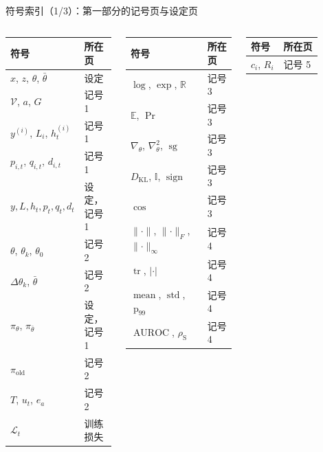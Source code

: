 \documentclass[aspectratio=169,11pt]{beamer}
\newcommand{\E}{\mathbb{E}}
\newcommand{\pit}{\pi_\theta}
\newcommand{\pitea}{\pi_{\bar\theta}}
\newcommand{\piold}{\pi_{\mathrm{old}}}
\newcommand{\sg}{\operatorname{sg}}
\newcommand{\KL}{D_{\mathrm{KL}}}
\newcommand{\Ind}{\mathbb{I}}
\newcommand{\abs}[1]{\lvert #1\rvert}
\newcommand{\norm}[1]{\lVert #1\rVert}
\newcommand{\pct}{\operatorname{p}_{99}}
\newcommand{\AUROC}{\operatorname{AUROC}}
\begin{document}
\begin{frame}{符号索引（1/3）：第一部分的记号页与设定页}
\scriptsize
\setlength{\tabcolsep}{3pt}\renewcommand{\arraystretch}{1.15}
\begin{columns}[T]
\begin{tabular}{@{}ll@{}}
\toprule
\textbf{符号} & \textbf{所在页}\\ \midrule
$x$, $z$, $\theta$, $\bar\theta$ & 设定\\
$\mathcal V$, $a$, $G$ & 记号 1\\
$y^{(i)}$, $L_i$, $h^{(i)}_t$ & 记号 1\\
$p_{i,t}$, $q_{i,t}$, $d_{i,t}$ & 记号 1\\
$y,L,h_t,p_t,q_t,d_t$ & 设定，记号 1\\
$\theta$, $\theta_k$, $\theta_0$ & 记号 2\\
$\Delta\theta_k$, $\bar\theta$ & 记号 2\\
$\pit$, $\pitea$ & 设定，记号 1\\
$\piold$ & 记号 2\\
$T$, $u_t$, $e_a$ & 记号 2\\
$\mathcal L_t$ & 训练损失\\
\bottomrule
\end{tabular}
\begin{tabular}{@{}ll@{}}
\toprule
\textbf{符号} & \textbf{所在页}\\ \midrule
$\log$, $\exp$, $\mathbb R$ & 记号 3\\
$\E$, $\Pr$ & 记号 3\\
$\nabla_\theta$, $\nabla^2_\theta$, $\sg$ & 记号 3\\
$\KL$, $\Ind$, $\operatorname{sign}$ & 记号 3\\
$\cos$ & 记号 3\\
$\norm{\cdot}$, $\norm{\cdot}_F$, $\norm{\cdot}_\infty$ & 记号 4\\
$\operatorname{tr}$, $\abs{\cdot}$ & 记号 4\\
$\operatorname{mean}$, $\operatorname{std}$, $\pct$ & 记号 4\\
$\AUROC$, $\rho_{\mathrm S}$ & 记号 4\\
\bottomrule
\end{tabular}
\begin{tabular}{@{}ll@{}}
\toprule
\textbf{符号} & \textbf{所在页}\\ \midrule
$c_i$, $R_i$ & 记号 5\\

\end{tabular}
\end{columns}
\end{frame}
\end{document}
